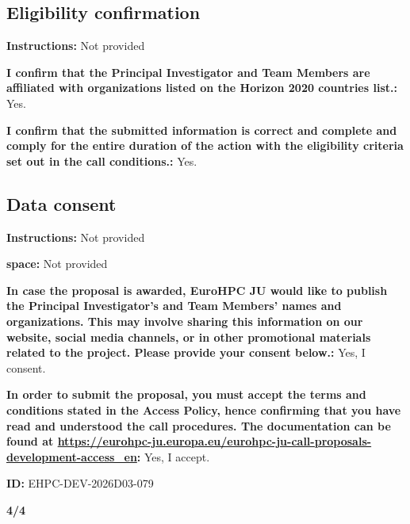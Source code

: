 \documentclass[11pt, a4paper]{article}
\begin{document}
\subsection*{Eligibility confirmation}

\noindent\textbf{Instructions:} Not provided

\vspace{0.5em}
\noindent\textbf{I confirm that the Principal Investigator and Team Members are affiliated with organizations listed on the Horizon 2020 countries list.:} Yes.

\vspace{0.5em}
\noindent\textbf{I confirm that the submitted information is correct and complete and comply for the entire duration of the action with the eligibility criteria set out in the call conditions.:} Yes.

\subsection*{Data consent}

\noindent\textbf{Instructions:} Not provided

\vspace{0.5em}
\noindent\textbf{space:} Not provided

\vspace{0.5em}
\noindent\textbf{In case the proposal is awarded, EuroHPC JU would like to publish the Principal Investigator’s and Team Members’ names and organizations. This may involve sharing this information on our website, social media channels, or in other promotional materials related to the project. Please provide your consent below.:} Yes, I consent.

\vspace{0.5em}
\noindent\textbf{In order to submit the proposal, you must accept the terms and conditions stated in the Access Policy, hence confirming that you have read and understood the call procedures. The documentation can be found at \url{https://eurohpc-ju.europa.eu/eurohpc-ju-call-proposals-development-access_en}:} Yes, I accept.

\vspace{0.5em}
\noindent\textbf{ID:} EHPC-DEV-2026D03-079

\vspace{0.5em}
\noindent\textbf{4/4}
\end{document}
